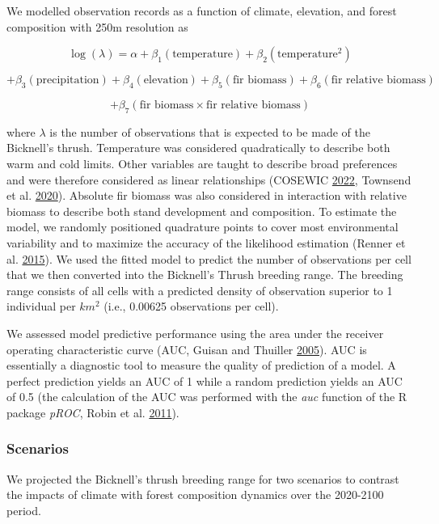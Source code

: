 \documentclass[12pt]{article}
\begin{document}
We modelled observation records as a function of climate, elevation, and
forest composition with 250m resolution as

\[
\log(\lambda) = \alpha + \beta_1(\text{temperature}) + \beta_2(\text{temperature}^{2})
\]

\[
+ \beta_3(\text{precipitation}) + \beta_4(\text{elevation}) + \beta_5(\text{fir biomass}) + \beta_6(\text{fir relative biomass})
\]

\[
+ \beta_7(\text{fir biomass} \times \text{fir relative biomass})
\]

where \(\lambda\) is the number of observations that is expected to be
made of the Bicknell's thrush. Temperature was considered quadratically
to describe both warm and cold limits. Other variables are taught to
describe broad preferences and were therefore considered as linear
relationships (COSEWIC
\protect\hyperlink{ref-cosewic_cosewic_2022}{2022}, Townsend et al.
\protect\hyperlink{ref-billerman_bicknells_2020}{2020}). Absolute fir
biomass was also considered in interaction with relative biomass to
describe both stand development and composition. To estimate the model,
we randomly positioned quadrature points to cover most environmental
variability and to maximize the accuracy of the likelihood estimation
(Renner et al. \protect\hyperlink{ref-renner_point_2015}{2015}). We used
the fitted model to predict the number of observations per cell that we
then converted into the Bicknell's Thrush breeding range. The breeding
range consists of all cells with a predicted density of observation
superior to 1 individual per \(km^2\) (i.e., 0.00625 observations per
cell).

We assessed model predictive performance using the area under the
receiver operating characteristic curve (AUC, Guisan and Thuiller
\protect\hyperlink{ref-guisan_predicting_2005}{2005}). AUC is
essentially a diagnostic tool to measure the quality of prediction of a
model. A perfect prediction yields an AUC of 1 while a random prediction
yields an AUC of 0.5 (the calculation of the AUC was performed with the
\emph{auc} function of the R package \emph{pROC}, Robin et al.
\protect\hyperlink{ref-robin_proc_2011}{2011}).

\hypertarget{scenarios}{%
\subsubsection{Scenarios}\label{scenarios}}

We projected the Bicknell's thrush breeding range for two scenarios to
contrast the impacts of climate with forest composition dynamics over
the 2020-2100 period.
\end{document}
